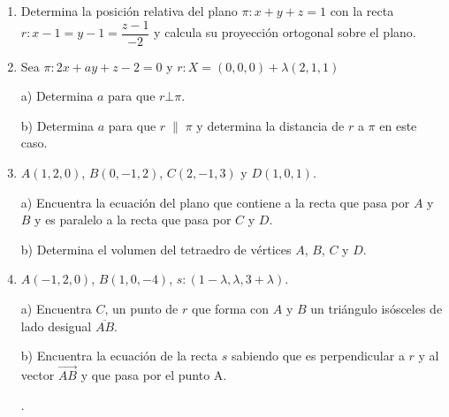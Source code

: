 \begin{enumerate}
\item Determina la posición relativa del plano $\pi:x+y+z=1$ con la recta $r:x-1=y-1=\dfrac{z-1}{-2}$ y calcula su proyección ortogonal sobre el plano.

\vspace{2mm} 

\item Sea $\pi:2x+ay+z-2=0$ y $r:X=(0,0,0)+\lambda(2,1,1)$

a) Determina $a$ para que $r\bot \pi$.

b) Determina $a$ para que $r\;\parallel\; \pi$ y determina la distancia de $r$ a $\pi$ en este caso.

\vspace{2mm} 

\item $A(1,2,0)$, $B(0,-1,2)$, $C(2,-1,3)$ y $D(1,0,1)$. 

a) Encuentra la ecuación del plano que contiene a la recta que pasa por $A$ y $B$ y es paralelo a la recta que pasa por $C$ y $D$.

b) Determina el volumen del tetraedro de vértices $A$, $B$, $C$ y $D$.

\vspace{2mm} 

\item $A(-1,2,0)$, $B(1,0,-4)$, $s:(1-\lambda, \lambda, 3+\lambda)$.

a) Encuentra $C$, un punto de $r$ que forma con $A$ y $B$ un triángulo isósceles de lado desigual $\overline{AB}$.

b) Encuentra la ecuación de la recta $s$ sabiendo que es perpendicular a $r$ y al vector $\overrightarrow{AB}$ y que pasa por el punto A.

.

\vspace{2mm} 


\end{enumerate}
